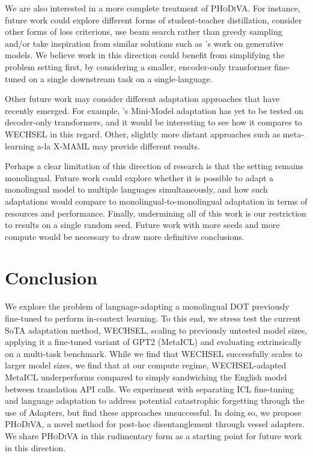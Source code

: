 \documentclass[11pt]{article}
\begin{document}
We are also interested in a more complete treatment of \textsc{PHoDiVA}. For instance, future work
could explore different forms of student-teacher distillation, consider other forms of loss
criterions, use beam search rather than greedy sampling and/or take inspiration from similar
solutions such as \citet{khrulkov_disentangled_2021}'s work on generative models. We believe work in
this direction could benefit from simplifying the problem setting first, by considering a smaller,
encoder-only transformer fine-tuned on a single downstream task on a single-language.

Other future work may consider different adaptation approaches that have recently emerged. For
example, \citet{marchisio_mini-model_2022}'s Mini-Model adaptation has yet to be tested on
decoder-only transformers, and it would be interesting to see how it compares to WECHSEL in this
regard. Other, slightly more distant approaches such as meta-learning a-la X-MAML
\citep{nooralahzadeh_zero-shot_2020} may provide different results.

Perhaps a clear limitation of this direction of research is that the setting remains monolingual.
Future work could explore whether it is possible to adapt a monolingual model to multiple languages
simultaneously, and how such adaptations would compare to monolingual-to-monolingual adaptation in
terms of resources and performance. Finally, undermining all of this work is our restriction to
results on a single random seed. Future work with more seeds and more compute would be necessary to
draw more definitive conclusions.


\section{Conclusion}

We explore the problem of language-adapting a monolingual DOT previously fine-tuned to perform
in-context learning. To this end, we stress test the current SoTA adaptation method, WECHSEL,
scaling to previously untested model sizes, applying it a fine-tuned variant of GPT2 (MetaICL) and
evaluating extrinsically on a multi-task benchmark. While we find that WECHSEL successfully scales
to larger model sizes, we find that at our compute regime, WECHSEL-adapted MetaICL underperforms
compared to simply sandwiching the English model between translation API calls. We experiment with
separating ICL fine-tuning and language adaptation to address potential catastrophic forgetting
through the use of Adapters, but find these approaches unsuccessful. In doing so, we propose
\textsc{PHoDiVA}, a novel method for post-hoc disentanglement through vessel adapters. We share
\textsc{PHoDiVA} in this rudimentary form as a starting point for future work in this direction.
\end{document}
